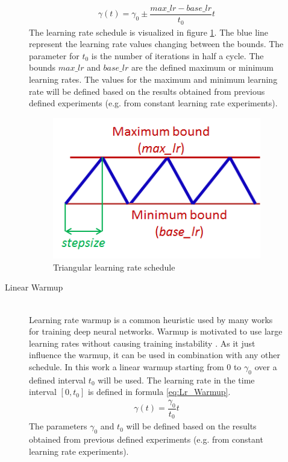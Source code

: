 \documentclass[12pt,DIV14,BCOR12mm,a4paper,footexclude,headinclude,halfparskip-,twoside,openright,cleardoubleempty,idxtotoc,bibtotoc,listtotoc,abstracton]{scrreprt} %
\numberwithin{equation}{chapter}
\begin{document}
\begin{description}
\begin{description}
\begin{align}
			\gamma(t) = \gamma_0\pm\dfrac{max\_lr-base\_lr}{t_0}t\label{eq:Lr_Triangular}
		\end{align}		
		The learning rate schedule is visualized in figure \ref{fig:Triangular Learning rate}. The blue line represent the learning rate values changing between the bounds. The parameter for $t_0$ is the number of iterations in half a cycle. The bounds $max\_lr$ and $base\_lr$ are the defined maximum or minimum learning rates. The values for the maximum and minimum learning rate will be defined based on the results obtained from previous defined experiments (e.g. from constant learning rate experiments).
		\begin{figure}[htb!]
			\centering
			\includegraphics[width=0.3\linewidth]{Graphiken/triangularWindow}
			\caption{Triangular learning rate schedule \cite{Smith15CyclicLearningRate}}
			\label{fig:Triangular Learning rate}
		\end{figure}
		\item[Linear Warmup]\hfill \\Learning rate warmup is a common heuristic used by many works for training deep neural networks. Warmup is motivated to use large learning rates without causing training instability \cite{gotmare2018Warmup}. As it just influence the warmup, it can be used in combination with any other schedule. In this work a linear warmup starting from $0$ to $\gamma_0$ over a defined interval $t_0$ will be used. The learning rate in the time interval $[0, t_0]$ is defined in formula \ref{eq:Lr_Warmup}.
		\begin{align}
			\gamma(t) = \dfrac{\gamma_0}{t_0}t\label{eq:Lr_Warmup}
		\end{align}
		The parameters $\gamma_0$ and $t_0$ will be defined based on the results obtained from previous defined experiments (e.g. from constant learning rate experiments).
	\end{description}
\end{description}
\end{document}
